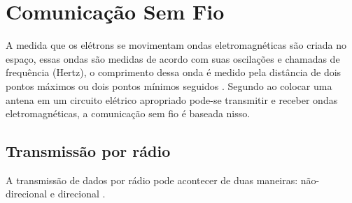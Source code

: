\section{Comunicação Sem Fio}
    \par
    A medida que os elétrons se movimentam ondas eletromagnéticas são criada no espaço, essas ondas são medidas de acordo com suas oscilações e chamadas de frequência (Hertz), o comprimento dessa onda é medido pela distância de dois pontos máximos ou dois pontos mínimos seguidos \cite{tenenbaum2002}.
    Segundo  ao colocar uma antena em um circuito elétrico apropriado pode-se  transmitir e receber ondas
    eletromagnéticas, a comunicação sem fio é baseada nisso.
    
    \subsection{Transmissão por rádio}
        
        \par
        A transmissão de dados por rádio pode acontecer de duas maneiras: não-direcional e direcional  \cite{torres2001}.
        
